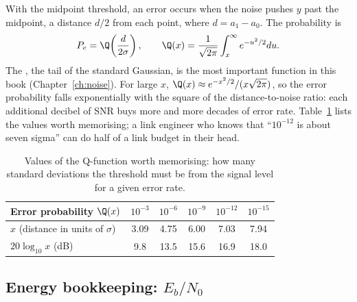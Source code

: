 With the midpoint threshold, an error occurs when the noise pushes $y$ past the midpoint, a
distance $d/2$ from each point, where $d=a_1-a_0$. The probability is
\begin{equation}
P_e=\Q\!\left(\frac{d}{2\sigma}\right),\qquad \Q(x)=\frac{1}{\sqrt{2\pi}}\int_x^\infty e^{-u^2/2}du.
\label{eq:ch08:pe}
\end{equation}
The , the tail of the standard Gaussian, is the most important function in
this book (Chapter~\ref{ch:noise}). For large $x$, $\Q(x)\approx e^{-x^2/2}/(x\sqrt{2\pi})$, so
the error probability falls exponentially with the square of the distance-to-noise ratio: each
additional decibel of SNR buys more and more decades of error rate.
Table~\ref{tab:ch08:qvalues} lists the values worth memorising; a link engineer who knows
that ``$10^{-12}$ is about seven sigma'' can do half of a link budget in their head.

\begin{table}[htbp]\centering\small
\caption{Values of the Q-function worth memorising: how many standard deviations the
threshold must be from the signal level for a given error rate.}
\label{tab:ch08:qvalues}
\begin{tabular}{@{}lccccc@{}}
\toprule
Error probability $\Q(x)$ & $10^{-3}$ & $10^{-6}$ & $10^{-9}$ & $10^{-12}$ & $10^{-15}$\\
\midrule
$x$ (distance in units of $\sigma$) & 3.09 & 4.75 & 6.00 & 7.03 & 7.94\\
$20\log_{10}x$ (dB) & 9.8 & 13.5 & 15.6 & 16.9 & 18.0\\
\bottomrule
\end{tabular}
\end{table}

\subsection{Energy bookkeeping: \texorpdfstring{$E_b/N_0$}{Eb/N0}}

